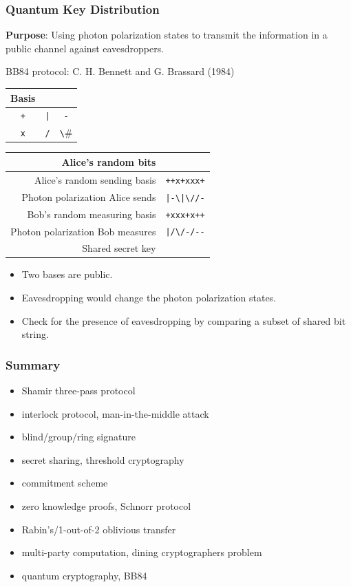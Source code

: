\begin{frame}[fragile]\frametitle{Quantum Key Distribution}
\textbf{Purpose}: Using photon polarization states to transmit the information in a public channel against eavesdroppers.

\begin{exampleblock}{BB84 protocol: C. H. Bennett and G. Brassard (1984)}
{\centering	
\begin{tabular}{|c|c|c|} \hline
Basis & \verb#0# & \verb#1# \\ \hline
\verb#+# & \verb#|# & \verb#-# \\ \hline
\verb#x# & \verb#/# & \verb#\# \\ \hline
\end{tabular}	
\begin{tabular}{|r|c|} \hline
Alice's random bits & \verb#01101001# \\ \hline
Alice's random sending basis & \verb#++x+xxx+# \\ \hline
Photon polarization Alice sends & \verb#|-\|\//-# \\ \hline
Bob's random measuring basis & \verb#+xxx+x++# \\ \hline
Photon polarization Bob measures & \verb#|/\/-/--# \\ \hline
Shared secret key & \verb#0 1  0 1# \\ \hline
\end{tabular}
}
\begin{itemize}
\item Two bases are public.
\item Eavesdropping would change the photon polarization states.
\item Check for the presence of eavesdropping by comparing a subset of shared bit string.
\end{itemize}
\end{exampleblock}
\end{frame}

\begin{frame}\frametitle{Summary}
\begin{itemize}
\item Shamir three-pass protocol
\item interlock protocol, man-in-the-middle attack
\item blind/group/ring signature
\item secret sharing, threshold cryptography
\item commitment scheme
\item zero knowledge proofs, Schnorr protocol
\item Rabin's/1-out-of-2 oblivious transfer
\item multi-party computation, dining cryptographers problem
\item quantum cryptography, BB84
\end{itemize}
\end{frame}
